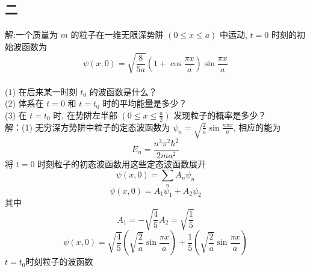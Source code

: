 \subsection{二}
解:一个质量为 $m$ 的粒子在一维无限深势阱 $(0 \leq x \leq a)$ 中运动, $t = 0$ 时刻的初始波函数为
$$\psi(x, 0) = \sqrt{\frac{8}{5a}} \left(1 + \cos \frac{\pi x}{a}\right)\sin \frac{\pi x}{a}~$$\\
(1) 在后来某一时刻 $t_0$ 的波函数是什么？\\
(2) 体系在 $t = 0$ 和 $t = t_0$ 时的平均能量是多少？\\
(3) 在 $t = t_0$ 时, 在势阱左半部 $(0 \leq x \leq \frac{a}{2})$ 发现粒子的概率是多少？\\
解：(1) 无穷深方势阱中粒子的定态波函数为 $\psi_n = \sqrt{\frac{2}{a}} \sin \frac{n\pi x}{a}$, 相应的能为 
$$E_n = \frac{n^2 \pi^2 \hbar^2}{2ma^2}~$$
将 $t = 0$ 时刻粒子的初态波函数用这些定态波函数展开
$$\psi(x, 0) = \sum_n A_n \psi_n~$$
$$\psi(x, 0) = A_1 \psi_1 + A_2 \psi_2~$$
其中 
$$A_1 = -\sqrt{\frac{4}{5}} A_2 = \sqrt{\frac{1}{5}}~$$
$$\psi(x, 0) = \sqrt{\frac{4}{5}}\left(\sqrt{\frac{2}{a}}\sin \frac{\pi x}{a}\right)+\frac{1}{5}\left(\sqrt{\frac{2}{a}}\sin \frac{\pi x}{a}\right)~$$
$t=t_0$时刻粒子的波函数
